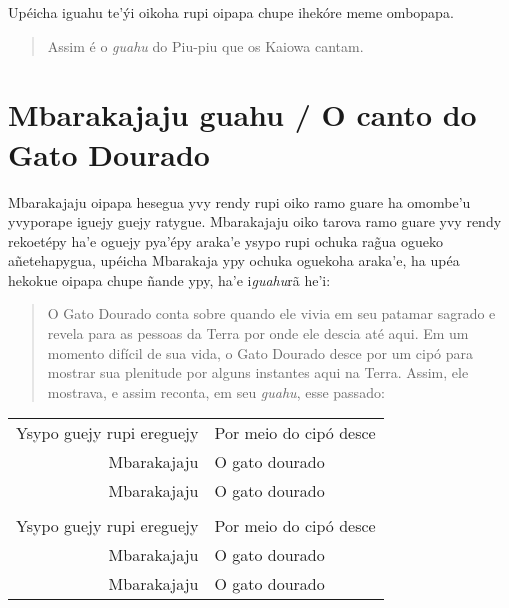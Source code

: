 \begin{itemize}
Upéicha iguahu te'ýi oikoha rupi oipapa chupe ihekóre meme ombopapa.

\begin{quote}
Assim é o \emph{guahu} do Piu-piu que os Kaiowa cantam.
\end{quote}

\chapter{Mbarakajaju guahu / O canto do Gato Dourado}

Mbarakajaju oipapa hesegua yvy rendy rupi oiko ramo guare ha omombe'u
yvyporape iguejy guejy ratygue. Mbarakajaju oiko tarova ramo guare yvy
rendy rekoetépy ha'e oguejy pya'épy araka'e ysypo rupi ochuka rag̃ua
ogueko añetehapygua, upéicha Mbarakaja ypy ochuka oguekoha araka'e, ha
upéa hekokue oipapa chupe ñande ypy, ha'e i\emph{guahu}rã he'i:

\begin{quote}
O Gato Dourado conta sobre quando ele vivia em seu patamar sagrado e
revela para as pessoas da Terra por onde ele descia até aqui. Em um
momento difícil de sua vida, o Gato Dourado desce por um cipó para
mostrar sua plenitude por alguns instantes aqui na Terra. Assim, ele
mostrava, e assim reconta, em seu \emph{guahu}, esse passado:
\end{quote}



\begin{table}[]
\begin{tabular}{rl}
Ysypo guejy rupi ereguejy          & Por meio do cipó desce           \\
Mbarakajaju\footnotemark{}          & O gato dourado           \\
Mbarakajaju 		& O gato dourado \\
                  &                     \\
Ysypo guejy rupi ereguejy          & Por meio do cipó desce           \\
Mbarakajaju          & O gato dourado           \\
Mbarakajaju          & O gato dourado           \\
\end{tabular}
\end{table}







\end{itemize}
